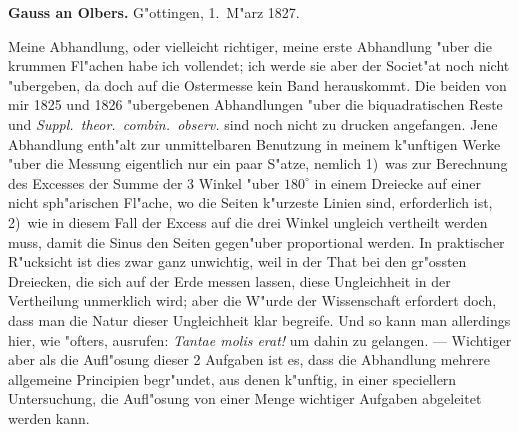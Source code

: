 \documentclass[12pt,a4paper]{article}
\theoremstyle{plain}
\theoremstyle{definition}
\theoremstyle{remark}
\begin{document}
\medskip
\noindent \textbf{Gauss an Olbers.} G"ottingen, 1.~M"arz 1827.

\medskip
\noindent Meine Abhandlung, oder vielleicht richtiger, meine erste Abhandlung "uber die krummen Fl"achen habe ich vollendet; ich werde sie aber der Societ"at noch nicht "ubergeben, da doch auf die Ostermesse kein Band herauskommt. Die beiden von mir 1825 und 1826 "ubergebenen Abhandlungen "uber die biquadratischen Reste und \emph{Suppl.\ theor.\ combin.\ observ.} sind noch nicht zu drucken angefangen. Jene Abhandlung enth"alt zur unmittelbaren Benutzung in meinem k"unftigen Werke "uber die Messung eigentlich nur ein paar S"atze, nemlich 1)~was zur Berechnung des Excesses der Summe der 3 Winkel "uber $180^{\circ}$ in einem Dreiecke auf einer nicht sph"arischen Fl"ache, wo die Seiten k"urzeste Linien sind, erforderlich ist, 2)~wie in diesem Fall der Excess auf die drei Winkel ungleich vertheilt werden muss, damit die Sinus den Seiten gegen"uber proportional werden. In praktischer R"ucksicht ist dies zwar ganz unwichtig, weil in der That bei den gr"ossten Dreiecken, die sich auf der Erde messen lassen, diese Ungleichheit in der Vertheilung unmerklich wird; aber die W"urde der Wissenschaft erfordert doch, dass man die Natur dieser Ungleichheit klar begreife. Und so kann man allerdings hier, wie "ofters, ausrufen: \emph{Tantae molis erat!} um dahin zu gelangen. --- Wichtiger aber als die Aufl"osung dieser 2 Aufgaben ist es, dass die Abhandlung mehrere allgemeine Principien begr"undet, aus denen k"unftig, in einer speciellern Untersuchung, die Aufl"osung von einer Menge wichtiger Aufgaben abgeleitet werden kann.
\end{document}
